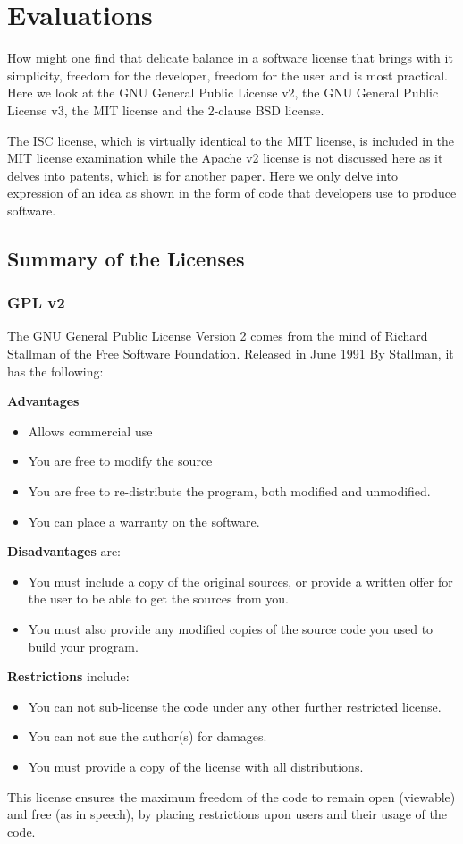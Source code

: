 \section{Evaluations}
How might one find that delicate balance in a software license that brings with it simplicity, freedom for the developer, freedom for the user and is most practical. Here we look at the GNU General Public License v2, the GNU General Public License v3, the MIT license and the 2-clause BSD license.

The ISC license, which is virtually identical to the MIT license, is included in the MIT license examination while the Apache v2 license is not discussed here as it delves into patents, which is for another paper. Here we only delve into expression of an idea as shown in the form of code that developers use to produce software.

\subsection{Summary of the Licenses}
\subsubsection{GPL v2}
The GNU General Public License Version 2 comes from the mind of Richard Stallman of the Free Software Foundation. Released in June 1991 By Stallman, it has the following:

\textbf{Advantages}
\begin{itemize}
\item Allows commercial use
\item You are free to modify the source
\item You are free to re-distribute the program, both modified and unmodified.
\item You can place a warranty on the software.
\end{itemize}
\textbf{Disadvantages} are:
\begin{itemize}
\item You must include a copy of the original sources, or provide a written offer for the user to be able to get the sources from you.
\item You must also provide any modified copies of the source code you used to build your program.
\end{itemize}
\textbf{Restrictions} include:
\begin{itemize}
\item You can not sub-license the code under any other further restricted license.
\item You can not sue the author(s) for damages.
\item You must provide a copy of the license with all distributions.
\end{itemize}
This license ensures the maximum freedom of the code to remain open (viewable) and free (as in speech), by placing restrictions upon users and their usage of the code.

